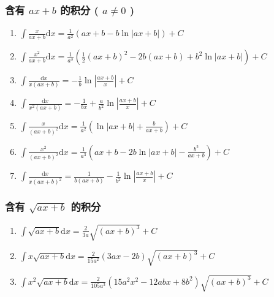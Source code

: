 \newcommand{\md}{\mathrm{d}}
\newcommand{\me}{\mathrm{e}}

\begin{small}

\subsubsection{含有 $ax+b$ 的积分 ( $a\neq 0$ )}

\begin{enumerate}

\item $ \int \frac{x}{ax+b} \md x = \frac{1}{a^2} (ax+b-b\ln|ax+b|) + C $

\item $ \int \frac{x^2}{ax+b} \md x = \frac{1}{a^3} \left( \frac{1}{2}(ax+b)^2-2b(ax+b)+b^2\ln|ax+b| \right) + C $

\item $ \int \frac{\md x}{x(ax+b)} = -\frac{1}{b}\ln \left| \frac{ax+b}{x} \right| + C $

\item $ \int \frac{\md x}{x^2(ax+b)} = -\frac{1}{bx} + \frac{a}{b^2}\ln\left| \frac{ax+b}{x} \right| + C $

\item $ \int \frac{x}{(ax+b)^2} \md x = \frac{1}{a^2}\left( \ln|ax+b|+\frac{b}{ax+b} \right) + C $

\item $ \int \frac{x^2}{(ax+b)^2}\md x = \frac{1}{a^3} \left( ax+b-2b\ln|ax+b|-\frac{b^2}{ax+b} \right) + C $

\item $ \int \frac{\md x}{x(ax+b)^2} = \frac{1}{b(ax+b)} - \frac{1}{b^2}\ln\left| \frac{ax+b}{x} \right| + C $

\end{enumerate}

\subsubsection{含有 $\sqrt{ax+b}$ 的积分}

\begin{enumerate}

\item $ \int \sqrt{ax+b} \mathrm{d}x = \frac{2}{3a} \sqrt{(ax+b)^3} + C $

\item $ \int x \sqrt{ax+b} \mathrm{d}x = \frac{2}{15a^2}(3ax-2b) \sqrt{(ax+b)^3} + C $

\item $ \int x^2 \sqrt{ax+b} \mathrm{d}x = \frac{2}{105a^3}(15a^2x^2-12abx+8b^2)\sqrt{(ax+b)^3} + C $


\end{enumerate}
\end{small}
